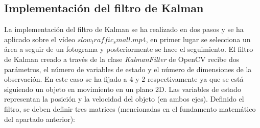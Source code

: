 \documentclass[a4paper,12pt]{article}
\begin{document}
{\vspace{0.5cm}

\subsection{Implementación del filtro de Kalman}

\vspace{0.5cm}

La implementación del filtro de Kalman se ha realizado en dos pasos y se ha aplicado sobre el vídeo $slow_traffic_small.mp4$, en primer lugar se selecciona un área a seguir de un fotograma y posteriormente se hace el seguimiento. El filtro de Kalman creado a través de la clase \textit{KalmanFilter} de OpenCV
recibe dos parámetros, el número de variables de estado y el número de dimensiones de la observación. En este caso se ha fijado a 4 y 2 respectivamente ya que se está siguiendo un objeto en movimiento en un plano 2D. Las variables de estado representan
la posición y la velocidad del objeto (en ambos ejes). Definido el filtro, se deben definir tres matrices (mencionadas en el fundamento matemático del apartado anterior):

\vspace{0.5cm}

}
\end{document}
